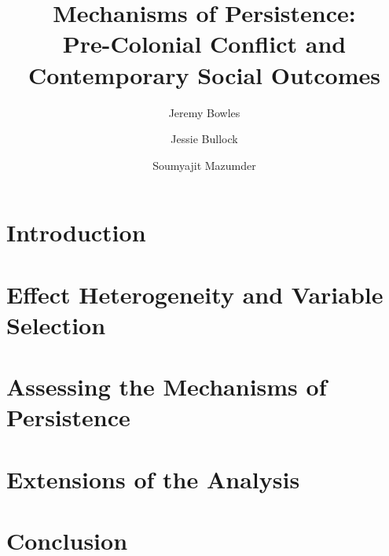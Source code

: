\documentclass[10.5pt]{article}
\title{Mechanisms of Persistence: \\ Pre-Colonial Conflict and Contemporary Social Outcomes}
\author{Jeremy Bowles \and Jessie Bullock \and Soumyajit Mazumder}
\begin{document}
\maketitle

\begin{abstract}

\end{abstract}

\section{Introduction}



\section{Effect Heterogeneity and Variable Selection}



\section{Assessing the Mechanisms of Persistence}



\section{Extensions of the Analysis}



\section{Conclusion}



\clearpage

 
 
\end{document}
